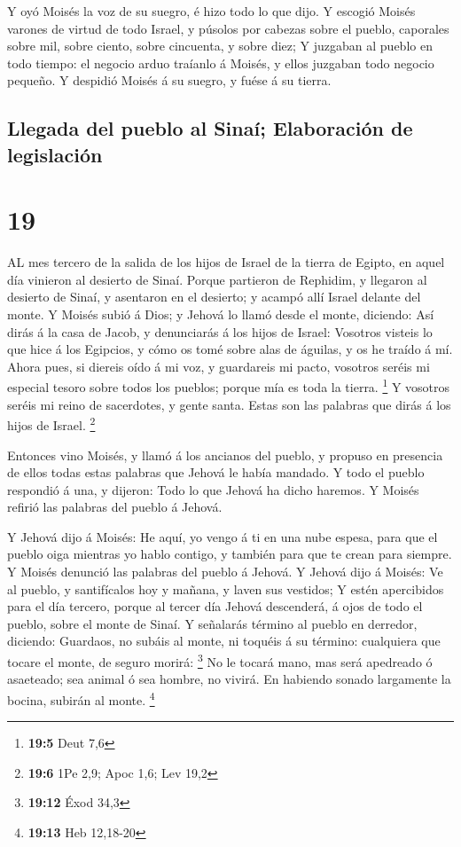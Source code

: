  Y oyó Moisés la voz de su suegro, é hizo todo lo que dijo.
 Y escogió Moisés varones de virtud de todo Israel, y
púsolos por cabezas sobre el pueblo, caporales sobre mil, sobre ciento,
sobre cincuenta, y sobre diez;  Y juzgaban al pueblo en
todo tiempo: el negocio arduo traíanlo á Moisés, y ellos juzgaban todo
negocio pequeño.  Y despidió Moisés á su suegro, y fuése á
su tierra.

\hypertarget{llegada-del-pueblo-al-sinauxed-elaboraciuxf3n-de-legislaciuxf3n}{%
\subsection{Llegada del pueblo al Sinaí; Elaboración de
legislación}\label{llegada-del-pueblo-al-sinauxed-elaboraciuxf3n-de-legislaciuxf3n}}

\hypertarget{section-18}{%
\section{19}\label{section-18}}

 AL mes tercero de la salida de los hijos de Israel de la
tierra de Egipto, en aquel día vinieron al desierto de Sinaí.
 Porque partieron de Rephidim, y llegaron al desierto de
Sinaí, y asentaron en el desierto; y acampó allí Israel delante del
monte.  Y Moisés subió á Dios; y Jehová lo llamó desde el
monte, diciendo: Así dirás á la casa de Jacob, y denunciarás á los hijos
de Israel:  Vosotros visteis lo que hice á los Egipcios, y
cómo os tomé sobre alas de águilas, y os he traído á mí. 
Ahora pues, si diereis oído á mi voz, y guardareis mi pacto, vosotros
seréis mi especial tesoro sobre todos los pueblos; porque mía es toda la
tierra. \footnote{\textbf{19:5} Deut 7,6}  Y vosotros seréis
mi reino de sacerdotes, y gente santa. Estas son las palabras que dirás
á los hijos de Israel. \footnote{\textbf{19:6} 1Pe 2,9; Apoc 1,6; Lev
  19,2}

 Entonces vino Moisés, y llamó á los ancianos del pueblo, y
propuso en presencia de ellos todas estas palabras que Jehová le había
mandado.  Y todo el pueblo respondió á una, y dijeron: Todo
lo que Jehová ha dicho haremos. Y Moisés refirió las palabras del pueblo
á Jehová.

 Y Jehová dijo á Moisés: He aquí, yo vengo á ti en una nube
espesa, para que el pueblo oiga mientras yo hablo contigo, y también
para que te crean para siempre. Y Moisés denunció las palabras del
pueblo á Jehová.  Y Jehová dijo á Moisés: Ve al pueblo, y
santifícalos hoy y mañana, y laven sus vestidos;  Y estén
apercibidos para el día tercero, porque al tercer día Jehová descenderá,
á ojos de todo el pueblo, sobre el monte de Sinaí.  Y
señalarás término al pueblo en derredor, diciendo: Guardaos, no subáis
al monte, ni toquéis á su término: cualquiera que tocare el monte, de
seguro morirá: \footnote{\textbf{19:12} Éxod 34,3}  No le
tocará mano, mas será apedreado ó asaeteado; sea animal ó sea hombre, no
vivirá. En habiendo sonado largamente la bocina, subirán al monte.
\footnote{\textbf{19:13} Heb 12,18-20}


